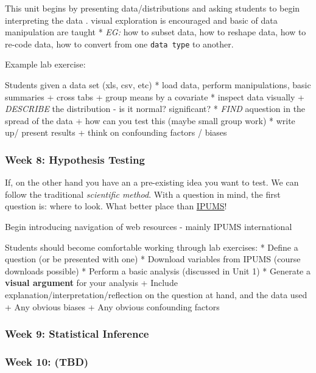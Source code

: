 \documentclass[
]{book}
\begin{document}
This unit begins by presenting data/distributions and asking students to begin interpreting the data . visual exploration is encouraged and basic of data manipulation are taught
* \emph{EG:} how to subset data, how to reshape data, how to re-code data, how to convert from one \texttt{data\ type} to another.

Example lab exercise:

Students given a data set (xls, csv, etc)
* load data, perform manipulations, basic summaries
+ cross tabs
+ group means by a covariate
* inspect data visually
+ \emph{DESCRIBE} the distribution - is it normal? significant?
* \emph{FIND} aquestion in the spread of the data
+ how can you test this (maybe small group work)
* write up/ present results
+ think on confounding factors / biases

\hypertarget{week-8-hypothesis-testing}{%
\subsubsection*{Week 8: Hypothesis Testing}\label{week-8-hypothesis-testing}}

If, on the other hand you have an a pre-existing idea you want to test. We can follow the traditional \emph{scientific method}. With a question in mind, the first question is: where to look. What better place than \href{https://ipums.org}{IPUMS}!

Begin introducing navigation of web resources - mainly IPUMS international

Students should become comfortable working through lab exercises:
* Define a question (or be presented with one)
* Download variables from IPUMS (course downloads possible)
* Perform a basic analysis (discussed in Unit 1)
* Generate a \textbf{visual argument} for your analysis
+ Include explanation/interpretation/reflection on the question at hand, and the data used
+ Any obvious biases
+ Any obvious confounding factors

\hypertarget{week-9-statistical-inference}{%
\subsubsection*{Week 9: Statistical Inference}\label{week-9-statistical-inference}}

\hypertarget{week-10-tbd}{%
\subsubsection*{Week 10: (TBD)}\label{week-10-tbd}}
\end{document}
